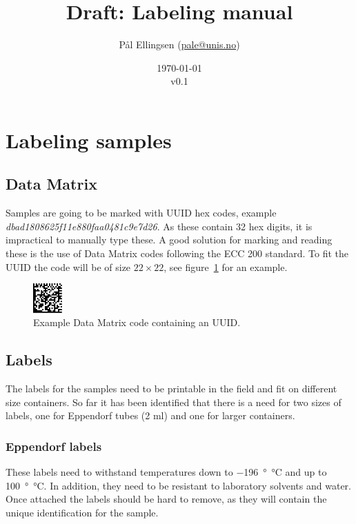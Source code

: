 \documentclass[a4paper,english, 11pt]{article}
\title{Draft: Labeling manual}
\date{\today\\v0.1}
\author{Pål Ellingsen (\url{pale@unis.no})}
\begin{document}
\maketitle
\tableofcontents
\section{Labeling samples} %
\label{sec:Labeling samples}

\subsection{Data Matrix} %
\label{ssub:Data Matrix}
Samples are going to be marked with UUID hex codes, example \emph{dbad1808625f11e880faa0481c9e7d26}. As these contain 32 hex digits, it is impractical to manually type these. A good solution for marking and reading these is the use of Data Matrix codes following the ECC 200 standard. To fit the UUID the code will be of size  $22\times22$, see figure~\ref{fig:data_matrix} for an example.

\begin{figure}[htb]
    \centering
    \includegraphics[width=0.1\textwidth]{Data_matrix.png}
    \caption{\label{fig:data_matrix}
        Example Data Matrix code containing an UUID.
    }
\end{figure}

\subsection{Labels} %
\label{sub:Labels}

The labels for the samples need to be printable in the field and fit on different size containers. So far it has been identified that there is a need for two sizes of labels, one for Eppendorf tubes (2 ml) and one for larger containers.

\subsubsection{Eppendorf labels} %
\label{ssub:Eppendorf labels}

These labels need to withstand temperatures down to \SI{-196}{\degree\celsius} and up to \SI{100}{\degree\celsius}. In addition, they need to be resistant to laboratory solvents and water. Once attached the labels should be hard to remove, as they will contain the unique identification for the sample.
\end{document}
